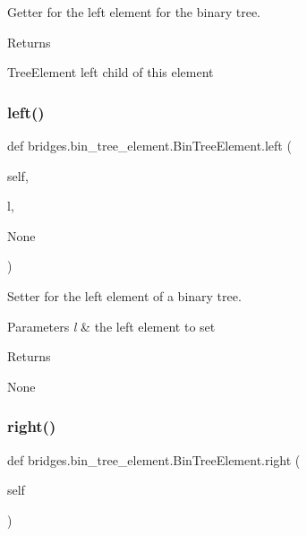 Getter for the left element for the binary tree. 

\begin{DoxyReturn}{Returns}


Tree\+Element left child of this element 
\end{DoxyReturn}
\mbox{\label{classbridges_1_1bin__tree__element_1_1_bin_tree_element_a8c3fb48d81700421f87a439b030d34fa}} 
\subsubsection{\texorpdfstring{left()}{left()}\hspace{0.1cm}{\footnotesize\ttfamily [2/2]}}
{\footnotesize\ttfamily def bridges.\+bin\+\_\+tree\+\_\+element.\+Bin\+Tree\+Element.\+left (\begin{DoxyParamCaption}\item[{}]{self,  }\item[{}]{l,  }\item[{}]{None }\end{DoxyParamCaption})}



Setter for the left element of a binary tree. 


\begin{DoxyParams}{Parameters}
{\em l} & the left element to set \\
\hline
\end{DoxyParams}
\begin{DoxyReturn}{Returns}


None 
\end{DoxyReturn}
\mbox{\label{classbridges_1_1bin__tree__element_1_1_bin_tree_element_adb7eaa3c67233aa5c368e8907043f451}} 
\subsubsection{\texorpdfstring{right()}{right()}\hspace{0.1cm}{\footnotesize\ttfamily [1/2]}}
{\footnotesize\ttfamily def bridges.\+bin\+\_\+tree\+\_\+element.\+Bin\+Tree\+Element.\+right (\begin{DoxyParamCaption}\item[{}]{self }\end{DoxyParamCaption})}



